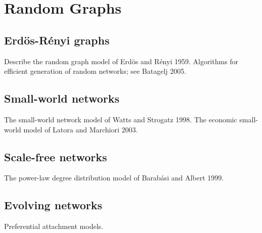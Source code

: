 
\chapter{Random Graphs}
\label{chap:random_graphs}



\section{Erd{\"o}s-R{\'e}nyi graphs}

Describe the random graph model of Erd{\"o}s and R{\'e}nyi
1959. Algorithms for efficient generation of random networks; see
Batagelj 2005.



\section{Small-world networks}

The small-world network model of Watts and Strogatz 1998. The economic
small-world model of Latora and Marchiori 2003.



\section{Scale-free networks}

The power-law degree distribution model of Barab{\'a}si and Albert 1999.



\section{Evolving networks}

Preferential attachment models.
